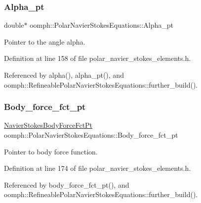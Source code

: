 \subsubsection{\texorpdfstring{Alpha\+\_\+pt}{Alpha\_pt}}
{\footnotesize\ttfamily double$\ast$ oomph\+::\+Polar\+Navier\+Stokes\+Equations\+::\+Alpha\+\_\+pt\hspace{0.3cm}{\ttfamily [protected]}}



Pointer to the angle alpha. 



Definition at line 158 of file polar\+\_\+navier\+\_\+stokes\+\_\+elements.\+h.



Referenced by alpha(), alpha\+\_\+pt(), and oomph\+::\+Refineable\+Polar\+Navier\+Stokes\+Equations\+::further\+\_\+build().

\mbox{\label{classoomph_1_1PolarNavierStokesEquations_a49167de70c6cd7bab35cc76ef01be803}} 
\subsubsection{\texorpdfstring{Body\+\_\+force\+\_\+fct\+\_\+pt}{Body\_force\_fct\_pt}}
{\footnotesize\ttfamily \hyperlink{classoomph_1_1PolarNavierStokesEquations_adfe008551ad8039abe5c9bf23af8c0e3}{Navier\+Stokes\+Body\+Force\+Fct\+Pt} oomph\+::\+Polar\+Navier\+Stokes\+Equations\+::\+Body\+\_\+force\+\_\+fct\+\_\+pt\hspace{0.3cm}{\ttfamily [protected]}}



Pointer to body force function. 



Definition at line 174 of file polar\+\_\+navier\+\_\+stokes\+\_\+elements.\+h.



Referenced by body\+\_\+force\+\_\+fct\+\_\+pt(), and oomph\+::\+Refineable\+Polar\+Navier\+Stokes\+Equations\+::further\+\_\+build().

\mbox{\label{classoomph_1_1PolarNavierStokesEquations_a8be5c9ef3e825dac154d8cf41448978d}} 

